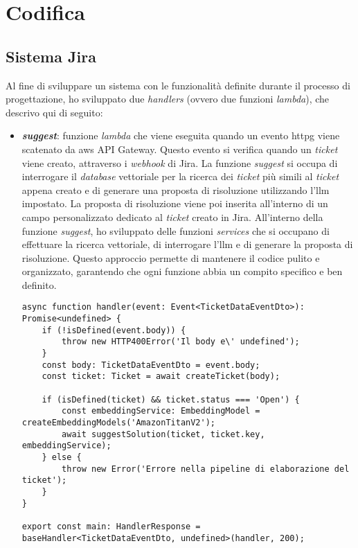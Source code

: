 \section{Codifica}
\subsection{Sistema Jira}

Al fine di sviluppare un sistema con le funzionalità definite durante il processo di progettazione, ho sviluppato due \textit{handlers} (ovvero due funzioni \textit{lambda}), che descrivo qui di seguito:

\begin{itemize}
    \item \textbf{\textit{suggest}}: funzione \textit{lambda} che viene eseguita quando un evento \gls{httpg} viene scatenato da \gls{aws} API Gateway. Questo evento si verifica quando un \textit{ticket} viene creato, attraverso i \textit{webhook} di Jira. La funzione \textit{suggest} si occupa di interrogare il \textit{database} vettoriale per la ricerca dei \textit{ticket} più simili al \textit{ticket} appena creato e di generare una proposta di risoluzione utilizzando l'\gls{llm} impostato. La proposta di risoluzione viene poi inserita all'interno di un campo personalizzato dedicato al \textit{ticket} creato in Jira.
    All'interno della funzione \textit{suggest}, ho sviluppato delle funzioni \textit{services} che si occupano di effettuare la ricerca vettoriale, di interrogare l'\gls{llm} e di generare la proposta di risoluzione. Questo approccio permette di mantenere il codice pulito e organizzato, garantendo che ogni funzione abbia un compito specifico e ben definito.
    \begin{verbatim}
async function handler(event: Event<TicketDataEventDto>): Promise<undefined> {
    if (!isDefined(event.body)) {
        throw new HTTP400Error('Il body e\' undefined');
    }
    const body: TicketDataEventDto = event.body;
    const ticket: Ticket = await createTicket(body);

    if (isDefined(ticket) && ticket.status === 'Open') {
        const embeddingService: EmbeddingModel = createEmbeddingModels('AmazonTitanV2');
        await suggestSolution(ticket, ticket.key, embeddingService);
    } else {
        throw new Error('Errore nella pipeline di elaborazione del ticket');
    }
}

export const main: HandlerResponse = baseHandler<TicketDataEventDto, undefined>(handler, 200);
    \end{verbatim}


\end{itemize}
